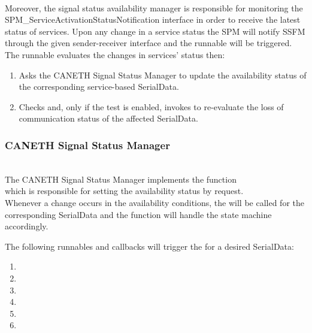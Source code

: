 {    }

\\
Moreover, the signal status availability manager is responsible for monitoring the SPM_ServiceActivationStatusNotification interface in order to receive the 
latest status of services. Upon any change in a service status the SPM will notify SSFM through the given sender-receiver interface and the runnable 
 will be triggered. The runnable evaluates the changes in services' status then:
\begin{enumerate}
    \item Asks the CANETH Signal Status Manager to update the availability status of the corresponding service-based SerialData.
    \item Checks  and, only if the test is enabled, invokes  to re-evaluate the loss of communication status of the affected SerialData.
\end{enumerate}
{   }


\subsubsection{CANETH Signal Status Manager}
\label{sec:CanEthsignalstatus}
\\
The CANETH Signal Status Manager implements the function \\  which is responsible for setting the availability status by request.
\\

Whenever a change occurs in the availability conditions, the  will be called for the corresponding SerialData and the function will handle the state machine accordingly.

The following runnables and callbacks will trigger the  for a desired SerialData:
\begin{enumerate}
    \item {}
    \item {}
    \item {}
    \item {}
    \item {} 
    \item {}
\end{enumerate}  

